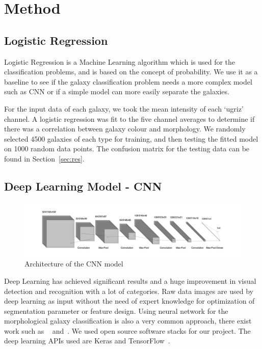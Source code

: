 \section{Method}
\label{sec:method}
\subsection{Logistic Regression}
\label{sec:log}
Logistic Regression is a Machine Learning algorithm which is used for the classification problems, and is based on the concept of probability. 
We use it as a baseline to see if the galaxy classification problem needs a more complex model such as CNN or if a simple model can more easily separate the galaxies. 

For the input data of each galaxy, we took the mean intensity of each `ugriz' channel. 
A logistic regression was fit to the five channel averages to determine if there was a correlation between galaxy colour and morphology. 
We randomly selected 4500 galaxies of each type for training, and then testing the fitted model on 1000 random data points. 
The confusion matrix for the testing data can be found in Section~\ref{sec:res}.

\subsection{Deep Learning Model - CNN}
\label{sec:cnn}
\begin{figure}[h]
	\centering
	\captionsetup{justification=centering}
	\includegraphics[width=\columnwidth]{Figures/CNNArchitecture.jpg}
	\caption{Architecture of the CNN model}
	\label{fig:cnnarch}
\end{figure}

Deep Learning has achieved significant results and a huge improvement in visual detection and recognition with a lot of categories. Raw data images are used by deep learning as input without the need of expert knowledge for optimization of segmentation parameter or feature design. Using neural network for the morphological galaxy classification is also a very common approach, there exist work such as ~\cite{banerji2010galaxy} and~\cite{khan2019deep}. 
We used open source software stacks for our project. The deep learning APIs used are Keras and TensorFlow~\cite{tensorflow}. 

